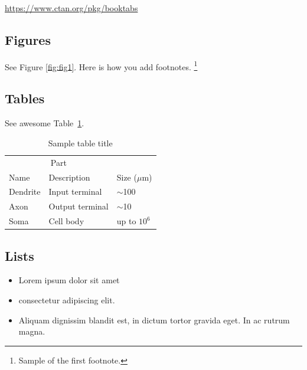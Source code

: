\documentclass{article}
\begin{document}
\begin{center}
  \url{https://www.ctan.org/pkg/booktabs}
\end{center}


\subsection{Figures}
\lipsum[10] 
See Figure \ref{fig:fig1}. Here is how you add footnotes. \footnote{Sample of the first footnote.}
\lipsum[11] 


\subsection{Tables}
\lipsum[12]
See awesome Table~\ref{tab:table}.

\begin{table}
 \caption{Sample table title}
  \centering
  \begin{tabular}{lll}
    \toprule
    \multicolumn{2}{c}{Part}                   \\
    \cmidrule(r){1-2}
    Name     & Description     & Size ($\mu$m) \\
    \midrule
    Dendrite & Input terminal  & $\sim$100     \\
    Axon     & Output terminal & $\sim$10      \\
    Soma     & Cell body       & up to $10^6$  \\
    \bottomrule
  \end{tabular}
  \label{tab:table}
\end{table}

\subsection{Lists}
\begin{itemize}
\item Lorem ipsum dolor sit amet
\item consectetur adipiscing elit. 
\item Aliquam dignissim blandit est, in dictum tortor gravida eget. In ac rutrum magna.
\end{itemize}


  


\end{document}
